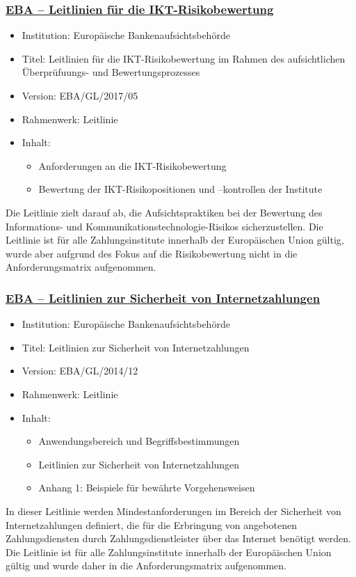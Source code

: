 \subsubsection{\underline{EBA – Leitlinien für die IKT-Risikobewertung}}
\begin{itemize}
    \item Institution: Europäische Bankenaufsichtsbehörde
    \item Titel: Leitlinien für die IKT-Risikobewertung im Rahmen des aufsichtlichen \\Überprüfuungs- und Bewertungsprozesses \autocite{eba_risk_assessment} 
    \item Version: EBA/GL/2017/05
    \item Rahmenwerk: Leitlinie
    \item Inhalt:
    \begin{itemize}
        \item Anforderungen an die IKT-Risikobewertung 
        \item Bewertung der IKT-Risikopositionen und –kontrollen der Institute
    \end{itemize}
\end{itemize}
\bigbreak
Die Leitlinie zielt darauf ab, die Aufsichtspraktiken bei der Bewertung des Informations- und Kommunikationstechnologie-Risikos sicherzustellen. Die Leitlinie ist für alle Zahlungsinstitute innerhalb der Europäischen Union gültig, wurde aber aufgrund des Fokus auf die Risikobewertung nicht in die Anforderungsmatrix aufgenommen. 


\subsubsection{\underline{EBA – Leitlinien zur Sicherheit von Internetzahlungen}}
\begin{itemize}
    \item Institution: Europäische Bankenaufsichtsbehörde 
    \item Titel: Leitlinien zur Sicherheit von Internetzahlungen \autocite{eba_internet_security}
    \item Version: EBA/GL/2014/12
    \item Rahmenwerk: Leitlinie
    \item Inhalt:
    \begin{itemize}
        \item Anwendungsbereich und Begriffsbestimmungen 
        \item Leitlinien zur Sicherheit von Internetzahlungen 
        \item Anhang 1: Beispiele für bewährte Vorgehensweisen 
    \end{itemize}
\end{itemize}
\bigbreak
In dieser Leitlinie werden Mindestanforderungen im Bereich der Sicherheit von Internetzahlungen definiert, die für die Erbringung von angebotenen Zahlungsdiensten durch Zahlungsdienstleister über das Internet benötigt werden. Die Leitlinie ist für alle Zahlungsinstitute innerhalb der Europäischen Union gültig und wurde daher in die Anforderungsmatrix aufgenommen.

